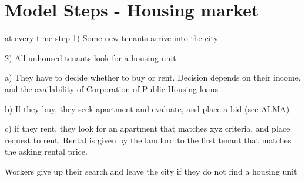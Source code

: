 \section{Model Steps - Housing market}


at every time step 
    1) Some new tenants arrive into the city
    
    2) All unhoused tenants look for a housing unit 
    
        a) They have to decide whether to buy or rent. Decision depends on their income, and the availability of Corporation of Public Housing loans 


        b) If they buy, they seek apartment and evaluate, and place a bid (see ALMA)
        
        c) if they rent, they look for an apartment that matches xyz criteria, and place request to rent. Rental is given by the landlord to the first tenant that matches the asking rental price. 


Workers give up their search and leave the city if they do not find a housing unit 

%

